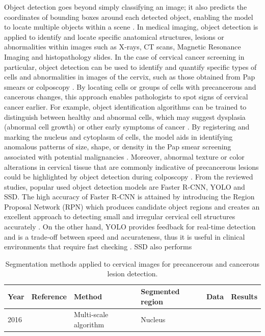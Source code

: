 \documentclass[final,5p,times,twocolumn,authoryear]{elsarticle}
\begin{document}
Object detection goes beyond simply classifying an image; it also predicts the coordinates of bounding boxes around each detected object, enabling the model to locate multiple objects within a scene \cite{ref80}. In medical imaging, object detection is applied to identify and locate specific anatomical structures, lesions or abnormalities within images such as X‑rays, CT scans, Magnetic Resonance Imaging and histopathology slides. In the case of cervical cancer screening in particular, object detection can be used to identify and quantify specific types of cells and abnormalities in images of the cervix, such as those obtained from Pap smears or colposcopy \cite{ref81}. By locating cells or groups of cells with precancerous and cancerous changes, this approach enables pathologists to spot signs of cervical cancer earlier. For example, object identification algorithms can be trained to distinguish between healthy and abnormal cells, which may suggest dysplasia (abnormal cell growth) or other early symptoms of cancer \cite{ref82}.
By registering and marking the nucleus and cytoplasm of cells, the model aids in identifying anomalous patterns of size, shape, or density in the Pap smear screening associated with potential malignancies \cite{ref83}. Moreover, abnormal texture or color alterations in cervical tissue that are commonly indicative of precancerous lesions could be highlighted by object detection during colposcopy \cite{ref84}.
From the reviewed studies, popular used object detection models are Faster R‑CNN, YOLO and SSD. The high accuracy of Faster R‑CNN is attained by introducing the Region Proposal Network (RPN) which produces candidate object regions and creates an excellent approach to detecting small and irregular cervical cell structures accurately \cite{ref6,ref88}. On the other hand, YOLO provides feedback for real‑time detection and is a trade‑off between speed and accurateness, thus it is useful in clinical environments that require fast checking \cite{ref6}. SSD also performs
\begin{table}[htbp]
\centering
\caption{Segmentation methods applied to cervical images for precancerous and cancerous lesion detection.}
\label{tab:segmentation}
\begin{tabular}{llllll}
\hline
Year & Reference & Method & Segmented region & Data & Results \\
\hline
2016 & \cite{ref68} & Multi‑scale algorithm & Nucleus & & \\
\hline
\end{tabular}
\end{table}
\end{document}
